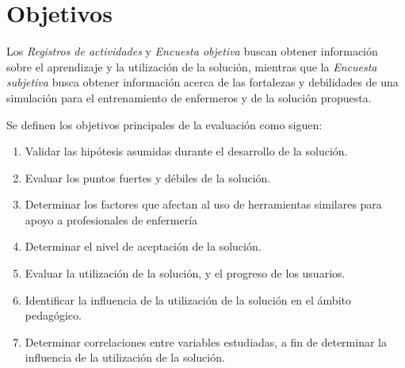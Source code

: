
\section{Objetivos}
\label{sec:objetivos}

Los \emph{Registros de actividades} y \emph{Encuesta objetiva} buscan obtener
información sobre el aprendizaje y la utilización de la solución, mientras que
la \emph{Encuesta subjetiva} busca obtener información acerca de las fortalezas
y debilidades de una simulación para el entrenamiento de enfermeros y de la
solución propuesta.

Se definen los objetivos principales de la evaluación como siguen:

\begin{enumerate}

\item Validar las hipótesis asumidas durante el desarrollo de la solución.

\item Evaluar los puntos fuertes y débiles de la solución.

\item Determinar los factores que afectan al uso de herramientas similares para
    apoyo a profesionales de enfermería
    
\item Determinar el nivel de aceptación de la solución.

\item Evaluar la utilización de la solución, y el progreso de los usuarios.

\item Identificar la influencia de la utilización de la solución en el ámbito
    pedagógico.

\item Determinar correlaciones entre variables estudiadas, a fin de determinar
    la influencia de la utilización de la solución.
    
\end{enumerate}

